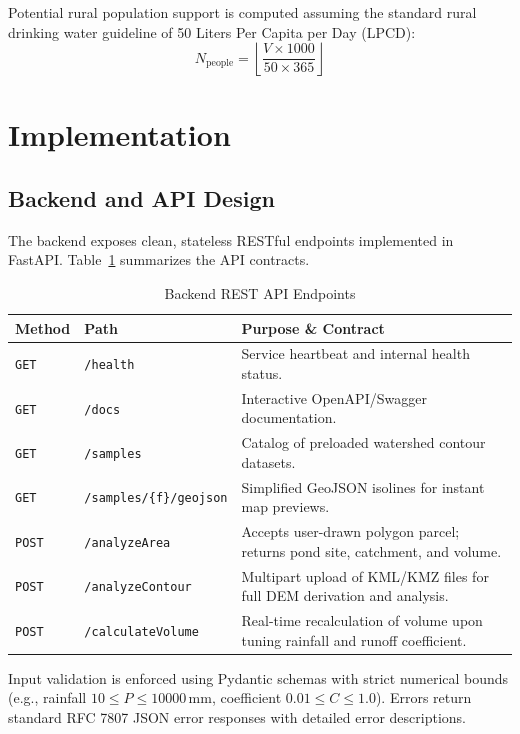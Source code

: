 \documentclass[manuscript,screen,review]{acmart}
\begin{document}
Potential rural population support is computed assuming the standard rural drinking water guideline of 50 Liters Per Capita per Day (LPCD):
\begin{equation}
N_{\text{people}} = \left\lfloor \frac{V \times 1000}{50 \times 365} \right\rfloor
\end{equation}

\section{Implementation}
\label{sec:implementation}

\subsection{Backend and API Design}
The backend exposes clean, stateless RESTful endpoints implemented in FastAPI. Table~\ref{tab:api-endpoints} summarizes the API contracts.

\begin{table}[h]
  \caption{Backend REST API Endpoints}
  \label{tab:api-endpoints}
  \begin{tabular}{llp{7.2cm}}
    \toprule
    Method & Path & Purpose \& Contract \\
    \midrule
    \texttt{GET} & \texttt{/health} & Service heartbeat and internal health status. \\
    \texttt{GET} & \texttt{/docs} & Interactive OpenAPI/Swagger documentation. \\
    \texttt{GET} & \texttt{/samples} & Catalog of preloaded watershed contour datasets. \\
    \texttt{GET} & \texttt{/samples/\{f\}/geojson} & Simplified GeoJSON isolines for instant map previews. \\
    \texttt{POST} & \texttt{/analyzeArea} & Accepts user-drawn polygon parcel; returns pond site, catchment, and volume. \\
    \texttt{POST} & \texttt{/analyzeContour} & Multipart upload of KML/KMZ files for full DEM derivation and analysis. \\
    \texttt{POST} & \texttt{/calculateVolume} & Real-time recalculation of volume upon tuning rainfall and runoff coefficient. \\
    \bottomrule
  \end{tabular}
\end{table}

Input validation is enforced using Pydantic schemas with strict numerical bounds (e.g., rainfall $10 \le P \le 10000$\,mm, coefficient $0.01 \le C \le 1.0$). Errors return standard RFC 7807 JSON error responses with detailed error descriptions.
\end{document}
